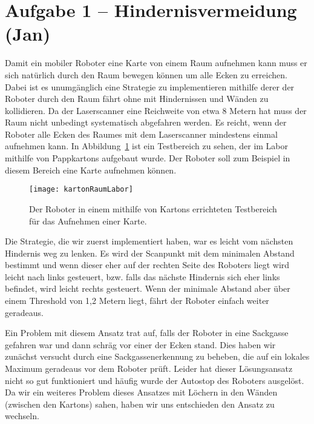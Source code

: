 \section{Aufgabe 1 -- Hindernisvermeidung (Jan)}

Damit ein mobiler Roboter eine Karte von einem Raum aufnehmen kann muss er sich natürlich durch den Raum bewegen können um alle Ecken zu erreichen. Dabei ist es unumgänglich eine Strategie zu implementieren mithilfe derer der Roboter durch den Raum fährt ohne mit Hindernissen und Wänden zu kollidieren.
Da der Laserscanner eine Reichweite von etwa 8 Metern hat muss der Raum nicht unbedingt systematisch abgefahren werden. Es reicht, wenn der Roboter alle Ecken des Raumes mit dem Laserscanner mindestens einmal aufnehmen kann. In Abbildung~\ref{fig:kartonRaumLabor} ist ein Testbereich zu sehen, der im Labor mithilfe von Pappkartons aufgebaut wurde. Der Roboter soll zum Beispiel in diesem Bereich eine Karte aufnehmen können.

\begin{figure}[H]
	\centering
	\texttt{[image: kartonRaumLabor]}
	\caption{Der Roboter in einem mithilfe von Kartons errichteten Testbereich für das Aufnehmen einer Karte.}
	\label{fig:kartonRaumLabor}
\end{figure}

Die Strategie, die wir zuerst implementiert haben, war es leicht vom nächsten Hindernis weg zu lenken. Es wird der Scanpunkt mit dem minimalen Abstand bestimmt und wenn dieser eher auf der rechten Seite des Roboters liegt wird leicht nach links gesteuert, bzw. falls das nächste Hindernis sich eher links befindet, wird leicht rechts gesteuert. Wenn der minimale Abstand aber über einem Threshold von 1,2 Metern liegt, fährt der Roboter einfach weiter geradeaus.

Ein Problem mit diesem Ansatz trat auf, falls der Roboter in eine Sackgasse gefahren war und dann schräg vor einer der Ecken stand.
Dies haben wir zunächst versucht durch eine Sackgassenerkennung zu beheben, die auf ein lokales Maximum geradeaus vor dem Roboter prüft.
Leider hat dieser Lösungsansatz nicht so gut funktioniert und häufig wurde der Autostop des Roboters ausgelöst. Da wir ein weiteres Problem dieses Ansatzes mit Löchern in den Wänden (zwischen den Kartons) sahen, haben wir uns entschieden den Ansatz zu wechseln.

